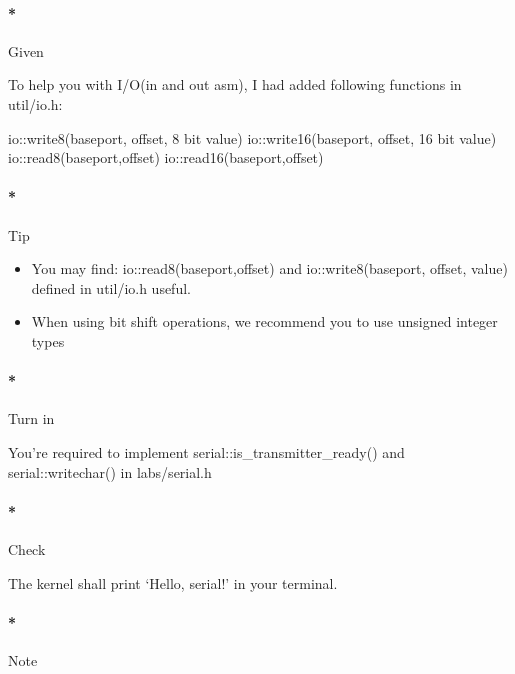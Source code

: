 \documentclass[]{article}
\newenvironment{Shaded}{}{}
\newcommand{\DecValTok}[1]{\textcolor[rgb]{0.00,0.00,1.00}{{#1}}}
\newcommand{\NormalTok}[1]{{#1}}
\providecommand{\tightlist}{%
  \setlength{\itemsep}{0pt}\setlength{\parskip}{0pt}}
\let\oldparagraph\paragraph
\renewcommand{\paragraph}[1]{\oldparagraph{#1}\mbox{}}
\begin{document}
\paragraph*{Given}\label{given-1}

To help you with I/O(in and out asm), I had added following functions in
util/io.h:

\begin{Shaded}
\begin{Highlighting}[]
    \NormalTok{io::write8(baseport, offset, }\DecValTok{8} \NormalTok{bit value)}
    \NormalTok{io::write16(baseport, offset, }\DecValTok{16} \NormalTok{bit value)}
    \NormalTok{io::read8(baseport,offset)}
    \NormalTok{io::read16(baseport,offset)}
\end{Highlighting}
\end{Shaded}

\paragraph*{Tip}\label{tip-1}

\begin{itemize}
\tightlist
\item
  You may find: io::read8(baseport,offset) and io::write8(baseport,
  offset, value) defined in util/io.h useful.
\item
  When using bit shift operations, we recommend you to use unsigned
  integer types
\end{itemize}

\paragraph*{Turn in}\label{turn-in-1}

You're required to implement serial::is\_transmitter\_ready() and
serial::writechar() in labs/serial.h

\paragraph*{Check}\label{check-1}

The kernel shall print `Hello, serial!' in your terminal.

\paragraph*{Note}\label{note-2}
\end{document}
